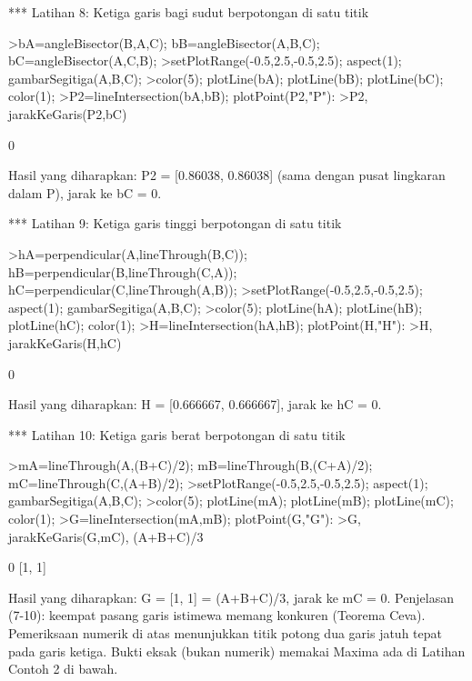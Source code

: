 \documentclass[a4paper,10pt]{article}
\begin{document}
\begin{eulernotebook}
\begin{eulercomment}
\begin{eulercomment}
\begin{eulercomment}
\begin{eulercomment}
\begin{eulercomment}
*** Latihan 8: Ketiga garis bagi sudut berpotongan di satu titik
\end{eulercomment}
\begin{eulerprompt}
>bA=angleBisector(B,A,C); bB=angleBisector(A,B,C); bC=angleBisector(A,C,B);
>setPlotRange(-0.5,2.5,-0.5,2.5); aspect(1); gambarSegitiga(A,B,C);
>color(5); plotLine(bA); plotLine(bB); plotLine(bC); color(1);
>P2=lineIntersection(bA,bB); plotPoint(P2,"P"):
>P2, jarakKeGaris(P2,bC)
\end{eulerprompt}
\begin{euleroutput}
  [0.86038,  0.86038]
  0
\end{euleroutput}
\begin{eulercomment}
Hasil yang diharapkan: P2 = [0.86038, 0.86038] (sama dengan pusat lingkaran dalam P), jarak ke bC = 0.

*** Latihan 9: Ketiga garis tinggi berpotongan di satu titik
\end{eulercomment}
\begin{eulerprompt}
>hA=perpendicular(A,lineThrough(B,C)); hB=perpendicular(B,lineThrough(C,A)); hC=perpendicular(C,lineThrough(A,B));
>setPlotRange(-0.5,2.5,-0.5,2.5); aspect(1); gambarSegitiga(A,B,C);
>color(5); plotLine(hA); plotLine(hB); plotLine(hC); color(1);
>H=lineIntersection(hA,hB); plotPoint(H,"H"):
>H, jarakKeGaris(H,hC)
\end{eulerprompt}
\begin{euleroutput}
  [0.666667,  0.666667]
  0
\end{euleroutput}
\begin{eulercomment}
Hasil yang diharapkan: H = [0.666667, 0.666667], jarak ke hC = 0.

*** Latihan 10: Ketiga garis berat berpotongan di satu titik
\end{eulercomment}
\begin{eulerprompt}
>mA=lineThrough(A,(B+C)/2); mB=lineThrough(B,(C+A)/2); mC=lineThrough(C,(A+B)/2);
>setPlotRange(-0.5,2.5,-0.5,2.5); aspect(1); gambarSegitiga(A,B,C);
>color(5); plotLine(mA); plotLine(mB); plotLine(mC); color(1);
>G=lineIntersection(mA,mB); plotPoint(G,"G"):
>G, jarakKeGaris(G,mC), (A+B+C)/3
\end{eulerprompt}
\begin{euleroutput}
  [1,  1]
  0
  [1,  1]
\end{euleroutput}
\begin{eulercomment}
Hasil yang diharapkan: G = [1, 1] = (A+B+C)/3, jarak ke mC = 0.
Penjelasan (7-10): keempat pasang garis istimewa memang konkuren (Teorema Ceva). Pemeriksaan
numerik di atas menunjukkan titik potong dua garis jatuh tepat pada garis ketiga. Bukti
eksak (bukan numerik) memakai Maxima ada di Latihan Contoh 2 di bawah.


\end{eulercomment}
\end{eulercomment}
\end{eulercomment}
\end{eulercomment}
\end{eulercomment}
\end{eulernotebook}
\end{document}
